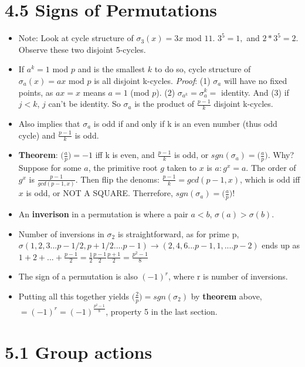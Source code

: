 \documentclass[11pt, oneside]{article}   	%
\begin{document}
\section{4.5 Signs of Permutations}
\begin{itemize}
\item Note: Look at cycle structure of $\sigma_3(x) = 3x $ mod $ 11.$ $ 3^5 = 1, $ and $ 2*3^5=2$.  Observe these two disjoint 5-cycles.
\item If $a^k = 1 $ mod $ p$ and is the smallest $k$ to do so, cycle structure of $\sigma_a(x) = ax $ mod $ p$ is all disjoint k-cycles.  \emph{Proof}: (1) $\sigma_a$ will have no fixed points, as $ax = x$ means $a = 1$ (mod $p$).  (2) $\sigma_{a^k} = \sigma_a^k = $ identity.  And (3) if $j < k$, $j$ can't be identity.   So $\sigma_a$ is the product of $\frac{p-1}{k}$ disjoint k-cycles.
\item Also implies that $\sigma_a$ is odd if and only if k is an even number (thus odd cycle) and $\frac{p-1}{k}$ is odd.
\item \textbf{Theorem}: $\Big(\frac{a}{p}\Big)  = -1$ iff k is even, and $\frac{p-1}{k}$ is odd, or $sgn(\sigma_a) = \Big(\frac{a}{p}\Big)$. Why? Suppose for some $a$, the primitive root $g$ taken to $x$ is $a: g^x = a$.  The order of $g^x$ is $\frac{p-1}{gcd(p-1,x)}$.  Then flip the denoms: $\frac{p-1}{k} = gcd(p-1,x)$, which is odd iff $x$ is odd, or NOT A SQUARE.  Therrefore, $sgn(\sigma_a) = \Big(\frac{a}{p}\Big) $!
\item An \textbf{inverison} in a permutation is where a pair $ a < b $, $\sigma(a) > \sigma(b)$.  
\item Number of inversions in $\sigma_2$ is straightforward, as for prime p, $\sigma(1, 2, 3 ... p-1/2, p+1/2 .... p-1) \rightarrow (2, 4, 6  ... p-1, 1, .... p-2)$ ends up as $ 1 + 2 + ... + \frac{p-1}{2} = \frac{1}{2} \frac{p-1}{2}\frac{p+1}{2} = \frac{p^2-1}{8}$
\item The sign of a permutation is also $(-1)^r$, where r is number of inversions.
\item Putting all this together yields $\Big(\frac{2}{p}\Big)  = sgn(\sigma_2)$ by \textbf{theorem} above, $ = (-1)^r = (-1)^\frac{p^2-1}{8}$, property 5 in the last section.
\end{itemize}



\section{5.1 Group actions}
\end{document}
